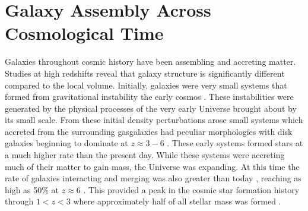 \section{Galaxy Assembly Across Cosmological Time}
\noindent Galaxies throughout cosmic history have been assembling and accreting matter. Studies at high redshifts reveal that galaxy structure is significantly different compared to the local volume. Initially, galaxies were very small systems that formed from gravitational instability \DIFdelbegin {}\DIFdelend \DIFaddbegin {}\DIFaddend the early cosmos \citep{1993MNRAS.262..627L}. These instabilities were generated by the physical processes of the very early Universe brought about by its small scale. From these initial density perturbations arose small systems which accreted from the surrounding gas\DIFdelbegin {}\DIFdelend \DIFaddbegin {}\DIFaddend galaxies had peculiar morphologies \citep{2005ApJ...627..632E} with disk galaxies beginning to dominate at $z\approx3 - 6$ \citep{2022ApJ...938L...2F}. These early systems formed stars at a much higher rate than the present day. While these systems were accreting much of their matter to gain mass, the Universe was expanding. At this time the rate of galaxies interacting and merging was also greater than today \citep{2010ApJ...715..202H, 2011ApJ...742..103L}, reaching as high as 50\% at $z\approx6$ \citep{2009MNRAS.397..208C, 2009MNRAS.394L..51B}. This provided a peak in the cosmic star formation \DIFdelbegin {}\DIFdelend history through $1 < z < 3$ where approximately half of all stellar mass was formed \citep{2005ApJ...625..621B}.

\DIFaddbegin {}

